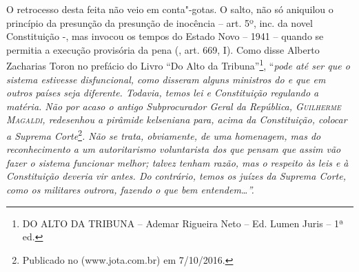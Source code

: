 O retrocesso desta feita não veio em conta"-gotas. O salto, não só
aniquilou o princípio da presunção da presunção de inocência -- art. 5º,
inc.  da novel Constituição -, mas invocou os tempos do Estado Novo
-- 1941 -- quando se permitia a execução provisória da pena (, art.
669, I). Como disse Alberto Zacharias Toron no prefácio do Livro ``Do
Alto da Tribuna''\footnote{DO ALTO DA TRIBUNA -- Ademar Rigueira Neto --
  Ed. Lumen Juris -- 1ª ed.}, ``\emph{pode até ser que o sistema
estivesse disfuncional, como disseram alguns ministros do  e que em
outros países seja diferente. Todavia, temos lei e Constituição
regulando a matéria. Não por acaso o antigo Subprocurador Geral da
República, \textsc{Guilherme Magaldi}, redesenhou a pirâmide kelseniana
para, acima da Constituição, colocar a Suprema Corte}\footnote{Publicado
  no  (www.jota.com.br) em 7/10/2016.}\emph{. Não se trata,
obviamente, de uma homenagem, mas do reconhecimento a um autoritarismo
voluntarista dos que pensam que assim vão fazer o sistema funcionar
melhor; talvez tenham razão, mas o respeito às leis e à Constituição
deveria vir antes. Do contrário, temos os juízes da Suprema Corte, como
os militares outrora, fazendo o que bem entendem\ldots{}''.}

